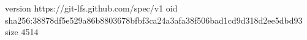version https://git-lfs.github.com/spec/v1
oid sha256:38878df5e529a86b8803678bfbf3ca24a3afa38f506bad1cd9d318d2ee5dbd93
size 4514
